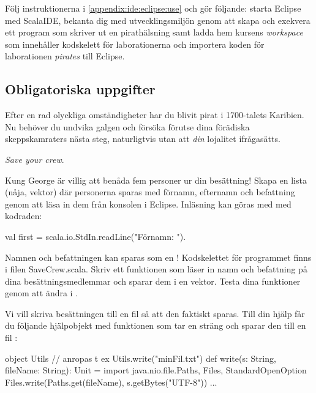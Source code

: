 Följ instruktionerna i \ref{appendix:ide:eclipse:use} och gör följande: starta Eclipse med ScalaIDE, bekanta dig med utvecklingsmiljön genom att skapa och exekvera ett program som skriver ut en pirathälsning samt ladda hem kursens \emph{workspace} som innehåller kodskelett för laborationerna och importera koden för laborationen \emph{pirates} till Eclipse. 



\subsection{Obligatoriska uppgifter}
Efter en rad olyckliga omständigheter har du blivit pirat i 1700-talets Karibien. Nu beh{\"o}ver du undvika galgen och f{\"o}rs{\"o}ka f{\"o}rutse dina f{\"o}r{\"a}diska skeppskamraters n{\"a}sta steg, naturligtvis utan att \emph{din} lojalitet ifrågasätts. 

\Task \emph{Save your crew}. 

\Subtask Kung George {\"a}r villig att ben{\aa}da fem personer ur din bes{\"a}ttning! Skapa en lista (nåja, vektor) d{\"a}r personerna sparas med f{\"o}rnamn, efternamn och befattning genom att l{\"a}sa in dem fr{\aa}n konsolen i Eclipse. Inl{\"a}sning kan g{\"o}ras med  med kodraden: 
\begin{Code}
val first = scala.io.StdIn.readLine("Förnamn: "). 
\end{Code}
Namnen och befattningen kan sparas som en ! Kodskelettet för programmet finns i filen SaveCrew.scala. Skriv ett funktionen  som läser in namn och befattning på dina besättningsmedlemmar och sparar dem i en vektor. Testa dina funktioner genom att ändra i .

\Subtask Vi vill skriva besättningen till en fil så att den faktiskt sparas. Till din hjälp får du följande hjälpobjekt  med funktionen  som tar en sträng  och sparar den till en fil :
\begin{CodeSmall}
object Utils{
   // anropas t ex Utils.write("minFil.txt")
  def write(s: String, fileName: String): Unit = {
			import java.nio.file.{Paths, Files, StandardOpenOption}
			Files.write(Paths.get(fileName), s.getBytes("UTF-8"))
  } 
  ...
}
\end{CodeSmall}

